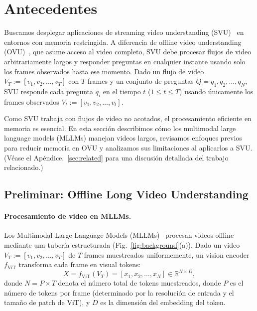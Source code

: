 \section{Antecedentes}\label{sec:background}

Buscamos desplegar aplicaciones de streaming video understanding (SVU)~\cite{zhang2024flashvstream,Shangzhe2025streaming} en entornos con memoria restringida. A diferencia de offline video understanding (OVU)~\cite{MLVU,fu2024videomme,wu2024longvideobench}, que asume acceso al video completo, SVU debe procesar flujos de video arbitrariamente largos y responder preguntas en cualquier instante usando solo los frames observados hasta ese momento. Dado un flujo de video $V_T := [v_1, v_2, \dots, v_T]$ con $T$ frames y un conjunto de preguntas $Q = {q_1, q_2, \dots, q_N}$, SVU responde cada pregunta $q_i$ en el tiempo $t$ ($1 \le t \le T$) usando únicamente los frames observados $V_t := [v_1, v_2, \dots, v_t]$.

Como SVU trabaja con flujos de video no acotados, el procesamiento eficiente en memoria es esencial. En esta sección describimos cómo los multimodal large language models (MLLMs) manejan videos largos, revisamos enfoques previos para reducir memoria en OVU y analizamos sus limitaciones al aplicarlos a SVU. (Véase el Apéndice.~\ref{sec:related} para una discusión detallada del trabajo relacionado.)

\subsection{Preliminar: Offline Long Video Understanding}

\paragraph{Procesamiento de video en MLLMs.} Los Multimodal Large Language Models (MLLMs)~\cite{zhang2024llavanext-video,qwen2.5,Qwen2VL} procesan videos offline mediante una tubería estructurada (Fig.~\ref{fig:background}(a)). Dado un video $V_T := [v_1, v_2, \dots, v_T]$ de $T$ frames muestreados uniformemente, un vision encoder $f_{\text{ViT}}$ transforma cada frame en visual tokens:
\begin{equation}
X = f_{\text{ViT}}(V_T) = [x_1, x_2, \dots, x_N] \in \mathbb{R}^{N \times D},
\label{eq:vision_encoding}
\end{equation}
donde $N = P \times T$ denota el número total de tokens muestreados, donde $P$ es el número de tokens por frame (determinado por la resolución de entrada y el tamaño de patch de ViT), y $D$ es la dimensión del embedding del token.

